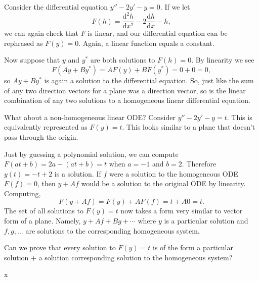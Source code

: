 \documentclass{problemset}
\renewcommand{\d}{\mathrm{d}}
\begin{document}
	Consider the differential equation $y''-2y'-y=0$.  If we let
	\[
		F(h)= \frac{\d^2 h}{\d x^2} - 2\frac{\d h}{\d x}-h,
	\]
	we can again check that $F$ is linear, and our differential equation can be rephrased
	as $F(y)=0$.  Again, a linear function equals a constant.

	Now suppose that $y$ and $y^*$ are both solutions to $F(h)=0$.  By linearity we see
	\[
		F(Ay+By^*) = AF(y)+BF(y^*) = 0+0=0,
	\]
	so $Ay+By^*$ is again a solution to the differential equation.  So, just like
	the sum of any two direction vectors for a plane was a direction vector, so
	is the linear combination of any two solutions to a homogeneous linear 
	differential equation.

	What about a non-homogeneous linear ODE?  Consider $y''-2y'-y=t$.  This is equivalently
	represented as $F(y)=t$.  This looks similar to a plane that doesn't pass through the origin.

	Just by guessing a polynomial solution, we can compute $F(at+b) = 2a-(at+b)=t$ when $a=-1$ and $b=2$.
	Therefore $y(t)=-t+2$ is a solution.  If $f$ were a solution to the homogeneous ODE $F(f)=0$,
	then $y+Af$ would be a solution to the original ODE by linearity.  Computing,
	\[
		F(y+Af) = F(y)+AF(f) = t+A0 = t.
	\]
	The set of all solutions to $F(y)=t$ now takes a form very similar to vector form of 
	a plane.  Namely, $y+Af+Bg+\cdots$ where $y$ is a particular solution and $f,g,\ldots$ are
	solutions to the corresponding homogeneous system.

	Can we prove that every solution to $F(y)=t$ is of the form a particular solution $+$
	a solution corresponding solution to the homogeneous system?

	\begin{theorem}
		x
	\end{theorem}
\end{document}
